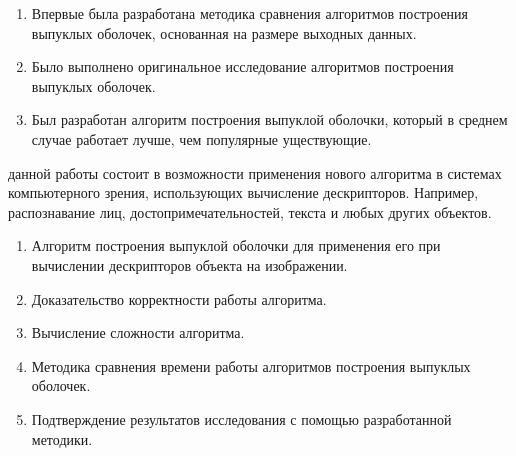 {\novelty}
\begin{enumerate}
  \item Впервые была разработана методика сравнения алгоритмов построения выпуклых оболочек, основанная на размере выходных данных.
  \item Было выполнено оригинальное исследование алгоритмов построения выпуклых оболочек.
  \item Был разработан алгоритм построения выпуклой оболочки, который в среднем случае работает лучше, чем популярные уществующие.
\end{enumerate}

{\influence} данной работы состоит в возможности применения нового алгоритма в системах компьютерного зрения, использующих вычисление дескрипторов. Например, распознавание лиц, достопримечательностей, текста и любых других объектов.

{}
\begin{enumerate}
  \item Алгоритм построения выпуклой оболочки для применения его при вычислении дескрипторов объекта на изображении.
  \item Доказательство корректности работы алгоритма.
  \item Вычисление сложности алгоритма.
  \item Методика сравнения времени работы алгоритмов построения выпуклых оболочек.
  \item Подтверждение результатов исследования с помощью разработанной методики.
\end{enumerate}


